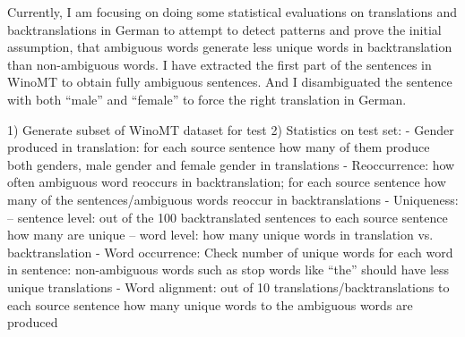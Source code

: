 Currently, I am focusing on doing some statistical evaluations on translations and backtranslations in German to attempt to detect patterns and prove the initial assumption, that ambiguous words generate less unique words in backtranslation than non-ambiguous words. 
I have extracted the first part of the sentences in WinoMT to obtain fully ambiguous sentences. And I disambiguated the sentence with both “male” and “female” to force the right translation in German.

1) Generate subset of WinoMT dataset for test
2) Statistics on test set:
- Gender produced in translation: for each source sentence how many of them produce both genders, male gender and female gender in translations
- Reoccurrence: how often ambiguous word reoccurs in backtranslation; for each source sentence how many of the sentences/ambiguous words reoccur in backtranslations
- Uniqueness: 
-- sentence level: out of the 100 backtranslated sentences to each source sentence how many are unique
-- word level: how many unique words in translation vs. backtranslation
- Word occurrence: Check number of unique words for each word in sentence: non-ambiguous words such as stop words like “the” should have less unique translations 
- Word alignment: out of 10 translations/backtranslations to each source sentence how many unique words to the ambiguous words are produced

